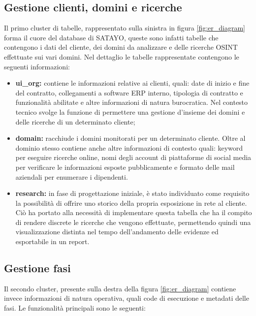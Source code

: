 \subsection{Gestione clienti, domini e ricerche}
\label{sub:db:mgmt}

Il primo cluster di tabelle, rappresentato sulla sinistra in figura \ref{fig:er_diagram}
forma il cuore del database di SATAYO, queste sono infatti tabelle che
contengono i dati del cliente, dei domini da analizzare e delle ricerche OSINT effettuate
sui vari domini. Nel dettaglio le tabelle rappresentate contengono le seguenti
informazioni:

\begin{itemize}
  \item \textbf{ui\_org:} contiene le informazioni relative ai clienti, quali:
    date di inizio e fine del contratto, collegamenti a software ERP interno,
    tipologia di contratto e funzionalità abilitate e altre informazioni di
    natura burocratica. Nel contesto tecnico svolge la funzione di permettere una
    gestione d'insieme dei domini e delle ricerche di un determinato cliente;

  \item \textbf{domain:} racchiude i domini monitorati per un determinato
    cliente. Oltre al dominio stesso contiene anche altre informazioni di contesto
    quali: keyword per eseguire ricerche online, nomi degli account di piattaforme
    di social media per verificare le informazioni esposte pubblicamente e formato
    delle mail aziendali per enumerare i dipendenti.

  \item \textbf{research:} in fase di progettazione iniziale, è stato individuato
    come requisito la possibilità di offrire uno storico della propria esposizione
    in rete al cliente. Ciò ha portato alla necessità di implementare questa
    tabella che ha il compito di rendere discrete le ricerche che vengono
    effettuate, permettendo quindi una visualizzazione distinta nel tempo dell'andamento
    delle evidenze ed esportabile in un report.
\end{itemize}

\subsection{Gestione fasi}
\label{sub:db:tasks}

Il secondo cluster, presente sulla destra della figura \ref{fig:er_diagram} contiene
invece informazioni di natura operativa, quali code di esecuzione e metadati
delle fasi. Le funzionalità principali sono le seguenti:

